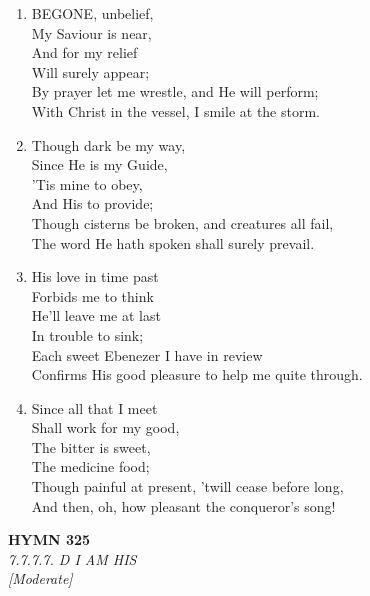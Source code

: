 \begin{enumerate}
    \item BEGONE, unbelief, \\
        My Saviour is near, \\
        And for my relief \\
        Will surely appear; \\
        By prayer let me wrestle, and He will perform; \\
        With Christ in the vessel, I smile at the storm.

    \item Though dark be my way, \\
        Since He is my Guide, \\
        'Tis mine to obey, \\
        And His to provide; \\
        Though cisterns be broken, and creatures all fail, \\
        The word He hath spoken shall surely prevail.

    \item His love in time past \\
        Forbids me to think \\
        He'll leave me at last \\
        In trouble to sink; \\
        Each sweet Ebenezer I have in review \\
        Confirms His good pleasure to help me quite through.

    \item Since all that I meet \\
        Shall work for my good, \\
        The bitter is sweet, \\
        The medicine food; \\
        Though painful at present, 'twill cease before long, \\
        And then, oh, how pleasant the conqueror's song!

\end{enumerate}

\newpage
\begin{center}
    {\Large \textbf{HYMN 325}}
    \\
    \textit{7.7.7.7. D I AM HIS}
    \\
    \textit{\small [Moderate]}
\end{center}
\vspace{1em}

